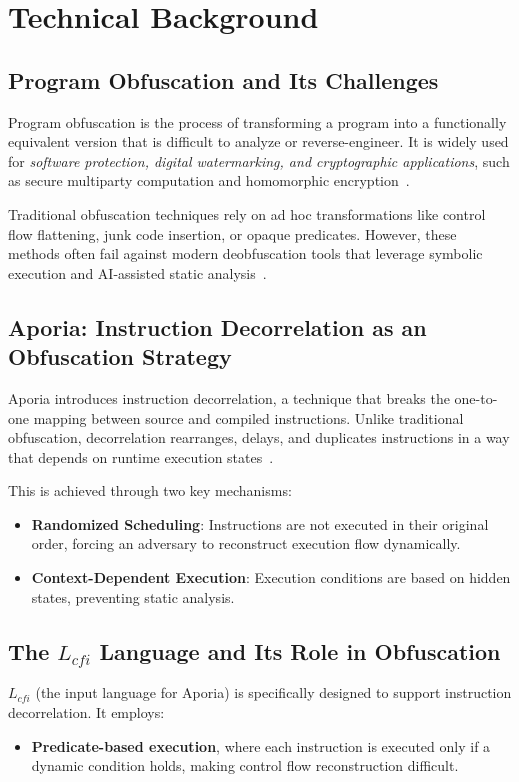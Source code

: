 \section{Technical Background}

\subsection{Program Obfuscation and Its Challenges}
Program obfuscation is the process of transforming a program into a functionally equivalent version that is difficult to analyze or reverse-engineer. It is widely used for \textit{software protection, digital watermarking, and cryptographic applications}, such as secure multiparty computation and homomorphic encryption~\cite{ajorian2024aporia}. 

Traditional obfuscation techniques rely on ad hoc transformations like control flow flattening, junk code insertion, or opaque predicates. However, these methods often fail against modern deobfuscation tools that leverage symbolic execution and AI-assisted static analysis~\cite{ajorian2024aporia}. 

\subsection{Aporia: Instruction Decorrelation as an Obfuscation Strategy}
Aporia introduces instruction decorrelation, a technique that breaks the one-to-one mapping between source and compiled instructions. Unlike traditional obfuscation, decorrelation rearranges, delays, and duplicates instructions in a way that depends on runtime execution states~\cite{ajorian2024aporia}. 

This is achieved through two key mechanisms:
\begin{itemize}
    \item \textbf{Randomized Scheduling}: Instructions are not executed in their original order, forcing an adversary to reconstruct execution flow dynamically.
    \item \textbf{Context-Dependent Execution}: Execution conditions are based on hidden states, preventing static analysis.
\end{itemize}

\subsection{The $L_{cfi}$ Language and Its Role in Obfuscation}
$L_{cfi}$ (the input language for Aporia) is specifically designed to support instruction decorrelation. It employs:
\begin{itemize}
    \item \textbf{Predicate-based execution}, where each instruction is executed only if a dynamic condition holds, making control flow reconstruction difficult.
\end{itemize}

